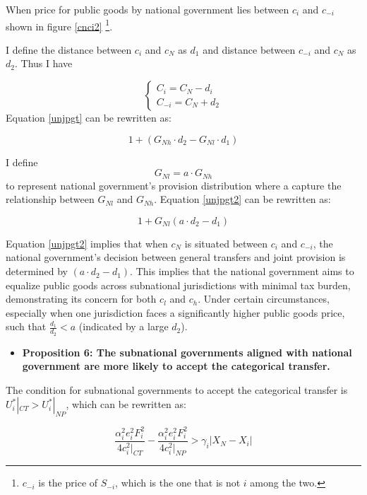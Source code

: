 \documentclass[man]{apa7}
\begin{document}
When price for public goods by national government lies between $c_i$ and $c_{-i}$ shown in figure \ref{cnci2} \footnote{$c_{-i}$ is the price of $S_{-i}$, which is the one that is not $i$ among the two. }.

I define the distance between $c_i$ and $c_N$ as $d_1$ and distance between $c_{-i}$ and $c_N$ as $d_2$. Thus I have

$$
  \left\{\begin{array}{l}
    C_i=C_N-d_i \\
    C_{-i}=C_N+d_2
  \end{array}\right.
$$
Equation \ref{unjpgt} can be rewritten as:

\begin{equation}
  1+(G_{Nh} \cdot d_2-G_{Nl} \cdot d_1) \label{unjpgt2}
\end{equation}

I define $$G_{Nl}= a \cdot G_{Nh}$$ to represent national government's provision distribution where a capture the relationship between $G_{Nl}$ and $G_{Nh}$. Equation \ref{unjpgt2} can be rewritten as:

\begin{equation}
  1+G_{Nl}(a \cdot d_2-d_1) \label{unjpgt3}
\end{equation}


Equation \ref{unjpgt2} implies that when $c_N$ is situated between $c_i$ and $c_{-i}$, the national government's decision between general transfers and joint provision is determined by $(a \cdot d_2 - d_1)$. This implies that the national government aims to equalize public goods across subnational jurisdictions with minimal tax burden, demonstrating its concern for both $c_l$ and $c_h$. Under certain circumstances, especially when one jurisdiction faces a significantly higher public goods price, such that $\frac{d_1}{d_2}<a$ (indicated by a large $d_2$).%

\begin {itemize}
\item \textbf{Proposition 6: The subnational governments aligned with national government are more likely to accept the categorical transfer.}
\end{itemize}

The condition for subnational governments to accept the categorical transfer is $U^*_i|_{CT}>U^*_i|_{NP}$, which can be rewritten as:

\begin{equation}
  \frac{\alpha_i^2 e_i^2 F_i^2}{4c_i^2|_{CT}}-\frac{\alpha_i^2 e_i^2 F_i^2}{4c_i^2|_{NP}}> \gamma_i|X_N-X_i|
\end{equation}
\end{document}
